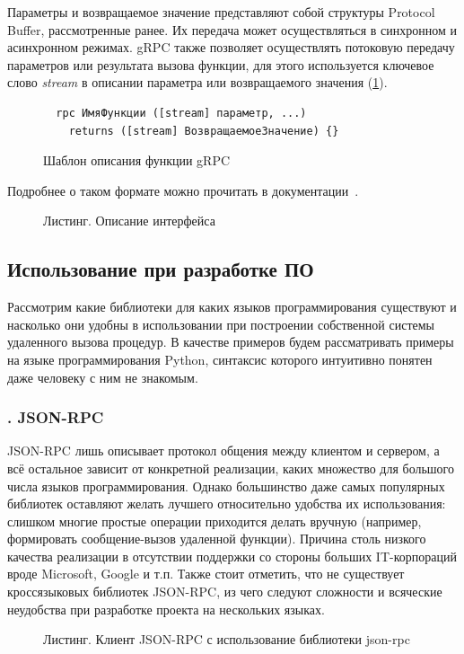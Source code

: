 \documentclass[a4paper,14pt,indentfirst]{extreport}
\newcommand{\EN}[1]{\foreignlanguage{english}{#1}}
\begin{document}
Параметры и возвращаемое значение представляют собой структуры \EN{Protocol Buffer}, рассмотренные ранее. Их передача может осуществляться в синхронном и асинхронном режимах. gRPC также позволяет осуществлять потоковую передачу параметров или результата вызова функции, для этого используется ключевое слово \textit{stream} в описании параметра или возвращаемого значения (\cref{grpc_template}).
\begin{figure}[h]
\begin{lstlisting}
  rpc ИмяФункции ([stream] параметр, ...) 
    returns ([stream] ВозвращаемоеЗначение) {}
\end{lstlisting}
\caption{Шаблон описания функции gRPC}
\label{grpc_template}
\end{figure}

Подробнее о таком формате можно прочитать в документации~\cite{3grpc}.
\begin{figure}[h]
  
  \caption{Листинг. Описание интерфейса}
  \label{grpc_proto}
\end{figure}
\FloatBarrier
\subsection{Использование при разработке ПО}
Рассмотрим какие библиотеки для каких языков программирования существуют и насколько они удобны в использовании при построении собственной системы удаленного вызова процедур. В качестве примеров будем рассматривать примеры на языке программирования Python, синтаксис которого интуитивно понятен даже человеку с ним не знакомым.
\subsubsection*{\thesubsubsection. JSON-RPC}
JSON-RPC лишь описывает протокол общения между клиентом и сервером, а всё остальное зависит от конкретной реализации, каких множество для большого числа языков программирования. Однако большинство даже самых популярных библиотек оставляют желать лучшего относительно удобства их использования: слишком многие простые операции приходится делать вручную (например, формировать сообщение-вызов удаленной функции). Причина столь низкого качества реализации в отсутствии поддержки со стороны больших IT-корпораций вроде Microsoft, Google и т.п. Также стоит отметить, что не существует кроссязыковых библиотек JSON-RPC, из чего следуют сложности и всяческие неудобства при разработке проекта на нескольких языках.
\begin{figure}[h]
  
  \caption{Листинг. Клиент JSON-RPC с использование библиотеки json-rpc}
  \label{json_client}
\end{figure}
\end{document}

